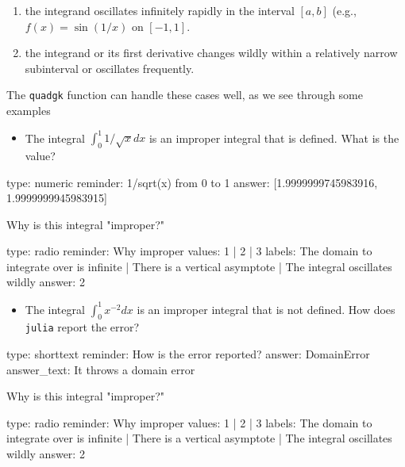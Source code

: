 \documentclass[12pt]{article}
\begin{document}
\begin{enumerate}
\def\labelenumi{\arabic{enumi})}
\setcounter{enumi}{2}
\item
  the integrand oscillates infinitely rapidly in the interval $[a,b]$
  (e.g., $f(x) = \sin(1/x)$ on $[-1,1]$.
\item
  the integrand or its first derivative changes wildly within a
  relatively narrow subinterval or oscillates frequently.
\end{enumerate}

The \texttt{quadgk} function can handle these cases well, as we see
through some examples

\begin{itemize}
\itemsep1pt\parskip0pt
\item
  The integral $\int_0^1 1/\sqrt{x}dx$ is an improper integral that is
  defined. What is the value?
\end{itemize}

\begin{answer}
    type: numeric
    reminder: 1/sqrt(x) from 0 to 1
    answer: [1.9999999745983916, 1.9999999945983915]

\end{answer}

Why is this integral "improper?"

\begin{answer}
type: radio
reminder: Why improper
values: 1 | 2 | 3
labels: The domain to integrate over is infinite | There is a vertical asymptote | The integral oscillates wildly
answer: 2
\end{answer}

\begin{itemize}
\itemsep1pt\parskip0pt
\item
  The integral $\int_0^1 x^{-2} dx$ is an improper integral that is not
  defined. How does \texttt{julia} report the error?
\end{itemize}

\begin{answer}
type: shorttext
reminder: How is the error reported?
answer: DomainError
answer_text: It throws a domain error 
\end{answer}

Why is this integral "improper?"

\begin{answer}
type: radio
reminder: Why improper
values: 1 | 2 | 3
labels: The domain to integrate over is infinite | There is a vertical asymptote | The integral oscillates wildly
answer: 2
\end{answer}
\end{document}

